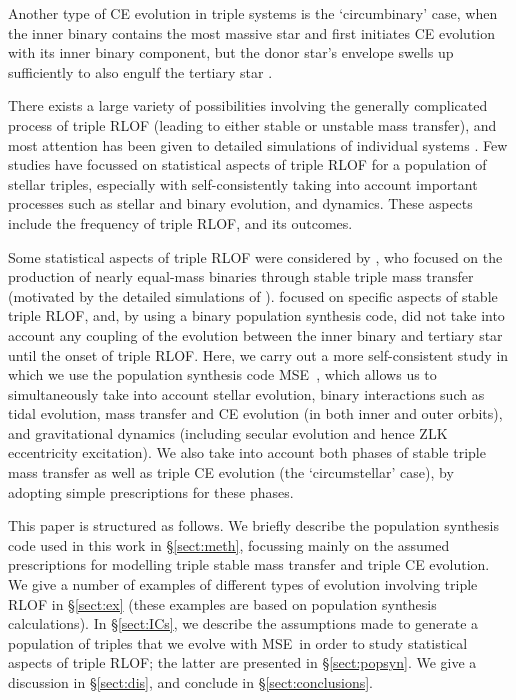 \documentclass[twocolumn,appendixfloats,tighten]{aastex631}
\newcommand{\mse}{\textsc{MSE}}
\begin{document}
Another type of CE evolution in triple systems is the `circumbinary' case, when the inner binary contains the most massive star and first initiates CE evolution with its inner binary component, but the donor star's envelope swells up sufficiently to also engulf the tertiary star \citep{2021MNRAS.500.1921G}. 

There exists a large variety of possibilities involving the generally complicated process of triple RLOF (leading to either stable or unstable mass transfer), and most attention has been given to detailed simulations of individual systems \citep[e.g.,][]{2014MNRAS.438.1909D,2017MNRAS.471.3456H,2019MNRAS.490.4748S,2021MNRAS.500.1921G}. Few studies have focussed on statistical aspects of triple RLOF for a population of stellar triples, especially with self-consistently taking into account important processes such as stellar and binary evolution, and dynamics. These aspects include the frequency of triple RLOF, and its outcomes.

Some statistical aspects of triple RLOF were considered by \citet{2020MNRAS.496.1819L}, who focused on the production of nearly equal-mass binaries through stable triple mass transfer (motivated by the detailed simulations of \citealt{2019ApJ...876L..33P}). \citet{2020MNRAS.496.1819L} focused on specific aspects of stable triple RLOF, and, by using a binary population synthesis code, did not take into account any coupling of the evolution between the inner binary and tertiary star until the onset of triple RLOF. Here, we carry out a more self-consistent study in which we use the population synthesis code \mse~\citep{2021MNRAS.502.4479H}, which allows us to simultaneously take into account stellar evolution, binary interactions such as tidal evolution, mass transfer and CE evolution (in both inner and outer orbits), and gravitational dynamics (including secular evolution and hence ZLK eccentricity excitation). We also take into account both phases of stable triple mass transfer as well as triple CE evolution (the `circumstellar' case), by adopting simple prescriptions for these phases. 

This paper is structured as follows. We briefly describe the population synthesis code used in this work in \S\ref{sect:meth}, focussing mainly on the assumed prescriptions for modelling triple stable mass transfer and triple CE evolution. We give a number of examples of different types of evolution involving triple RLOF in \S\ref{sect:ex} (these examples are based on population synthesis calculations). In \S\ref{sect:ICs}, we describe the assumptions made to generate a population of triples that we evolve with \mse~in order to study statistical aspects of triple RLOF; the latter are presented in \S\ref{sect:popsyn}. We give a discussion in \S\ref{sect:dis}, and conclude in \S\ref{sect:conclusions}.
\end{document}

